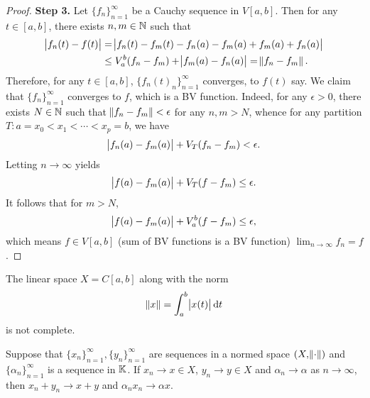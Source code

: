 \begin{proof}
\textbf{Step 3. }
Let $\{ f_n \}_{n=1}^{\infty}$ be a Cauchy sequence in $V[a, b]$. 
Then for any $t \in [a, b]$, there exists $n, m \in \mathbb{N}$ such that 
\begin{equation*}
    \begin{aligned}
        \abs{f_n(t) - f(t)} &= \abs{f_n(t) - f_m(t) - f_n(a) - f_m(a) 
            + f_m(a) + f_n(a)} \\
        &\le V_a^b(f_n - f_m) + \abs{f_m(a) - f_n(a)} = \norm{f_n - f_m}. 
    \end{aligned}
\end{equation*}
Therefore, for any $t \in [a, b]$, $\{ f_n(t)_n \}_{n=1}^{\infty}$ 
converges, to $f(t)$ say. 
We claim that $\{ f_n \}_{n=1}^{\infty}$ converges to $f$, which is a BV 
function. 
Indeed, for any $\epsilon > 0$, there exists $N \in \mathbb{N}$ such that 
$\norm{f_n - f_m} < \epsilon$ for any $n, m > N$, whence for any partition 
$T: a = x_0 < x_1 < \cdots < x_p = b$, we have 
\begin{equation*}
    \abs{f_n(a) - f_m(a)} + V_T(f_n - f_m) < \epsilon. 
\end{equation*}
Letting $n \to \infty$ yields 
\begin{equation*}
    \abs{f(a) - f_m(a)} + V_T(f - f_m) \le \epsilon. 
\end{equation*}
It follows that for $m > N$, 
\begin{equation*}
    \abs{f(a) - f_m(a)} + V_a^b(f - f_m) \le \epsilon, 
\end{equation*}
which means $f \in V[a, b]$ (sum of BV functions is a BV function) 
$\lim_{n \to \infty} f_n = f$. 
\end{proof}

\begin{defn}
The linear space $X = C[a, b]$ along with the norm 
\begin{equation*}
    \norm{x} = \int_{a}^{b} \abs{x(t)} \mathop{}\!\mathrm{d} t
\end{equation*}
is not complete. 
\end{defn}

\begin{prop}
Suppose that $\{x_n\}_{n=1}^\infty, \{y_n\}_{n=1}^\infty$ are sequences in 
a normed space $(X, \norm{\mathord{\cdot}})$ and $\{\alpha_n\}_{n=1}^\infty$ is a 
sequence in $\mathbb{K}$. 
If $x_n \to x \in X$, $y_n \to y \in X$ and $\alpha_n \to \alpha$ as $n \to 
\infty$, then $x_n + y_n \to x + y$ and $\alpha_n x_n \to \alpha x$. 
\end{prop}

